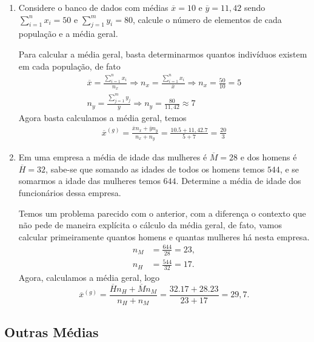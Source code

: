 \noindent \exemplo
\begin{enumerate}
    \item [(i)] Considere o banco de dados com médias $\overline{x} = 10$ e $\overline{y} = 11,42$ sendo $\sum_{i=1}^{n}x_i=50$ e $\sum_{j=1}^{m}y_i=80$, calcule o número de elementos de cada população e a média geral.
    
    \inic Para calcular a média geral, basta determinarmos quantos indivíduos existem em cada população, de fato
    \begin{align*}
        \overline{x} = \frac{\sum_{i=1}^{n}x_i}{n_x} \Rightarrow n_x = \frac{\sum_{i=1}^{n}x_i}{\overline{x}} \Rightarrow n_x = \frac{50}{10} = 5\\
         n_y = \frac{\sum_{j=1}^{m}y_j}{\overline{y}} \Rightarrow n_y = \frac{80}{11,42} \approx 7 
    \end{align*}
    Agora basta calculamos a média geral, temos
    \begin{align*}
        \overline{x}^{(g)} = \frac{\overline{x}n_x + \overline{y}n_y}{n_x+n_y} = \frac{10.5+11,42.7}{5+7} = \frac{20}{3}
    \end{align*}
    
    \item[(ii)] Em uma empresa a média de idade das mulheres é $\overline{M} = 28$ e dos homens é $\overline{H} = 32$, sabe-se que somando as idades de todos os homens temos $544$, e se somarmos a idade das mulheres temos $644$. Determine a média de idade dos funcionários dessa empresa.
    
    \inic Temos um problema parecido com o anterior, com a diferença o contexto que não pede de maneira explícita o cálculo da média geral, de fato, vamos calcular primeiramente quantos homens e quantas mulheres há nesta empresa.  
    \begin{align*}
    n_M &= \frac{644}{28} = 23, \\
    n_H &= \frac{544}{32} = 17.
    \end{align*}
    \inic Agora, calculamos a média geral, logo
    \begin{equation*}
        \overline{x}^{(g)} = \frac{\overline{H}n_H + \overline{M}n_M}{n_H+n_M} = \frac{32.17 + 28.23}{23+17} = 29,7.
    \end{equation*}
    
\end{enumerate}

\subsection{Outras Médias}
